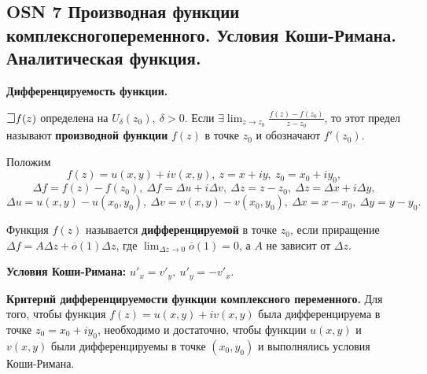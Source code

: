 \subsection{OSN 7 Производная функции комплексногопеременного. Условия Коши-Римана. Аналитическая  функция.}

\textbf{Дифференцируемость функции.}

$\mathLet f(z)$ определена на $U_{\delta}(z_0),~\delta > 0$. Если $\exists \displaystyle\lim_{z\to z_0} \frac{f(z) - f(z_0)}{z - z_0}$,
то этот предел называют \textbf{производной функции} $f(z)$ в точке $z_0$ и обозначают $f'(z_0)$.

Положим $$f(z) = u(x, y) + iv(x, y),~z = x + iy,~z_0 = x_0 + iy_0,$$
$$\Delta f = f(z)-f(z_0),~\Delta f = \Delta u + i\Delta v,~\Delta z = z- z_0,~\Delta z = \Delta x + i\Delta y,$$
$$\Delta u = u(x, y)-u(x_0, y_0),~\Delta v = v(x, y)-v(x_0, y_0),~\Delta x = x-x_0,~\Delta y = y- y_0.$$

Функция $f(z)$ называется \textbf{дифференцируемой} в точке $z_0$, если приращение $\Delta f = A\Delta z + \overline{o}(1)\Delta z$, где $\displaystyle\lim_{\Delta z\to0} \overline{o}(1) = 0$, а $A$ не зависит от $\Delta z$.

\textbf{Условия Коши-Римана:}
$u'_x = v'_y,~u'_y = -v'_x.$

\textbf{Критерий дифференцируемости функции комплексного переменного.}
Для того, чтобы функция $f(z) = u(x,y)+iv(x,y)$ была дифференцируема в точке $z_0 =x_0+iy_0$, необходимо и достаточно, чтобы функции $u(x,y)$ и $v(x,y)$ были дифференцируемы в точке $(x_0, y_0)$ и выполнялись условия Коши-Римана.

